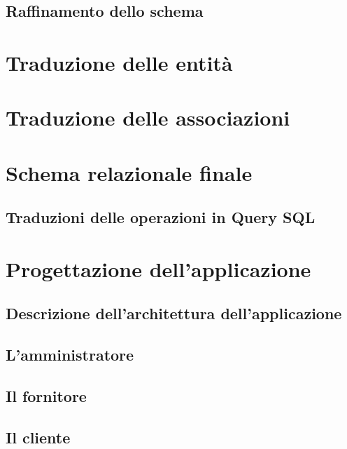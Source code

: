 \documentclass{article}
\begin{document}
\subsection{Raffinamento dello schema} %


\section{Traduzione delle entità}


\section{Traduzione delle associazioni}



\section{Schema relazionale finale} %


\subsection{Traduzioni delle operazioni in Query SQL}




\section{Progettazione dell'applicazione}
\subsection{Descrizione dell'architettura dell'applicazione}
 

\subsection{L'amministratore}


\subsection{Il fornitore}


\subsection{Il cliente}

\end{document}
